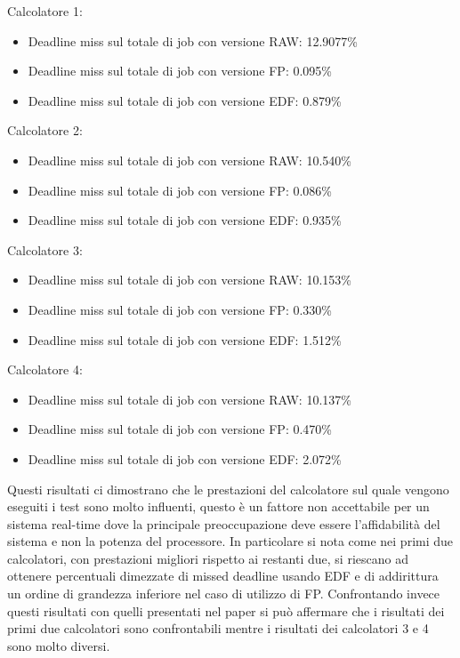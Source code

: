 \documentclass[conference]{IEEEtran}
\begin{document}
    Calcolatore 1: 
    \begin{itemize}
        \item Deadline miss sul totale di job con versione RAW: 12.9077\%
        \item Deadline miss sul totale di job con versione FP: 0.095\%
        \item Deadline miss sul totale di job con versione EDF: 0.879\%
    \end{itemize}
    Calcolatore 2: 
    \begin{itemize}
        \item Deadline miss sul totale di job con versione RAW: 10.540\%
        \item Deadline miss sul totale di job con versione FP: 0.086\%
        \item Deadline miss sul totale di job con versione EDF: 0.935\%
    \end{itemize}
    Calcolatore 3: 
    \begin{itemize}
        \item Deadline miss sul totale di job con versione RAW: 10.153\%
        \item Deadline miss sul totale di job con versione FP: 0.330\%
        \item Deadline miss sul totale di job con versione EDF: 1.512\%
    \end{itemize}
    Calcolatore 4: 
    \begin{itemize}
        \item Deadline miss sul totale di job con versione RAW: 10.137\%
        \item Deadline miss sul totale di job con versione FP: 0.470\%
        \item Deadline miss sul totale di job con versione EDF: 2.072\%
    \end{itemize}
    Questi risultati ci dimostrano che le prestazioni del calcolatore sul quale vengono eseguiti i test sono molto influenti, questo è un fattore non accettabile per un sistema real-time dove la principale preoccupazione deve essere l'affidabilità del sistema e non la potenza del processore. In particolare si nota come nei primi due calcolatori, con prestazioni migliori rispetto ai restanti due, si riescano ad ottenere percentuali dimezzate di missed deadline usando EDF e di addirittura un ordine di grandezza inferiore nel caso di utilizzo di FP. Confrontando invece questi risultati con quelli presentati nel paper si può affermare che i risultati dei primi due calcolatori sono confrontabili mentre i risultati dei calcolatori 3 e 4 sono molto diversi.
\end{document}
